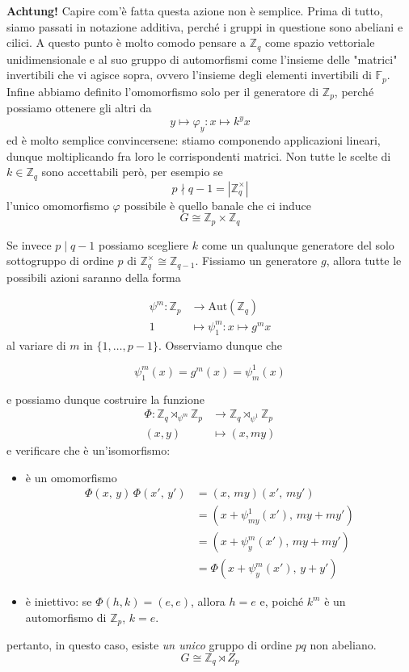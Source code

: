 \documentclass[a4paper]{article}
\theoremstyle{remark}
\theoremstyle{definition}
\newcommand{\Aut}[1]{\mathrm{Aut}\left( #1 \right)}
\newcommand{\Z}{\mathbb{Z}}
\newcommand{\fun}[5]{\begin{align*}
	#1 \colon #2 &\to #3 \\
	#4 &\mapsto #5
	\end{align*}}
\begin{document}
\begin{multicols}{2}
\textbf{Achtung!} Capire com'è fatta questa azione non è semplice. Prima di tutto, siamo passati in notazione additiva, perché i gruppi in questione sono abeliani e cilici. A questo punto è molto comodo pensare a $ \Z_q $ come spazio vettoriale unidimensionale e al suo gruppo di automorfismi come l'insieme delle "matrici" invertibili che vi agisce sopra, ovvero l'insieme degli elementi invertibili di $ \mathbb{F}_p $. Infine abbiamo definito l'omomorfismo solo per il generatore di $ \Z_p $, perché possiamo ottenere gli altri da
\[ y \mapsto \varphi_y : x \mapsto k^yx \]
ed è molto semplice convincersene: stiamo componendo applicazioni lineari, dunque moltiplicando fra loro le corrispondenti matrici.
Non tutte le scelte di $ k \in \Z_q $ sono accettabili però, per esempio se 
$$  p \nmid q-1 = |\Z_q^\times| $$
l'unico omomorfismo $ \varphi $ possibile è quello banale che ci induce
\[ \boxed{G \cong \Z_p \times \Z_q} \]

Se invece 
$ p \mid q -1 $
possiamo scegliere $ k $ come un qualunque generatore del solo sottogruppo di ordine $ p $ di $ \Z_q^\times \cong \Z_{q-1} $. Fissiamo un generatore $ g $, allora tutte le possibili azioni saranno della forma

\fun{\psi^m}{\Z_p}{\Aut{\Z_q}}{1}{\psi^m_{1}: x \mapsto g^mx}
al variare di $ m $ in $ \{1, \dots, p-1\} $.
Osserviamo dunque che

\[ \psi^m_1(x) = g^{m}(x) = \psi^1_m(x) \]


e possiamo dunque costruire la funzione
\fun{\Phi}{\Z_q \rtimes_{\psi^m} \Z_p}{\Z_q \rtimes_{\psi^1} \Z_p}{(x, y)}{(x, my)}
e verificare che è un'isomorfismo:
\begin{itemize}
	\item è un omomorfismo
	\begin{align*} \Phi(x,\, y)\,\Phi(x',\, y') &= (x,\, my)(x',\, my') \\&= (x + \psi_{my}^1(x'), \,my + my')
	\\&= (x + \psi_y^{m}(x'),\, my + my') \\&= \Phi(x + \psi^m_y(x'),\, y + y')  \end{align*} 
	\item è iniettivo: se $ \Phi(h, k) = (e, e) $, allora $ h = e $ e, poiché $ k^m $ è un automorfismo di $ \Z_p $, $ k = e $.
\end{itemize}
pertanto, in questo caso, esiste \emph{un unico} gruppo di ordine $ pq $ non abeliano. 
\[ \boxed{G \cong \Z_q \rtimes Z_p} \]



\end{multicols}
\end{document}
